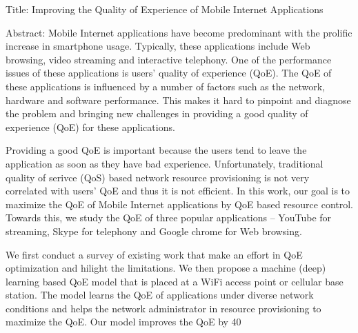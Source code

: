 Title: Improving the Quality of Experience of Mobile Internet Applications

Abstract: Mobile Internet applications have become predominant with the prolific increase in smartphone usage. Typically, these applications include Web browsing, video streaming and interactive telephony. One of the performance issues of these applications is users' quality of experience (QoE). The QoE of these applications is influenced by a number of factors such as the network, hardware and software performance. This makes it hard to pinpoint and diagnose the problem and bringing new challenges in providing a good quality of experience (QoE) for these applications. 

Providing a good QoE is important because the users tend to leave the application as soon as they have bad experience. Unfortunately, traditional quality of serivce (QoS) based network resource provisioning is not very correlated with users' QoE and thus it is not efficient. In this work, our goal is to maximize the QoE of Mobile Internet applications by QoE based resource control. Towards this, we study the QoE of three popular applications -- YouTube for streaming, Skype for telephony and Google chrome for Web browsing. 

We first conduct a survey of existing work that make an effort in QoE optimization and hilight the limitations. We then propose a machine (deep) learning based QoE model that is placed at a WiFi access point or cellular base station. The model learns the QoE of applications under diverse network conditions and helps the network administrator in resource provisioning to maximize the QoE. Our model improves the QoE by 40%
